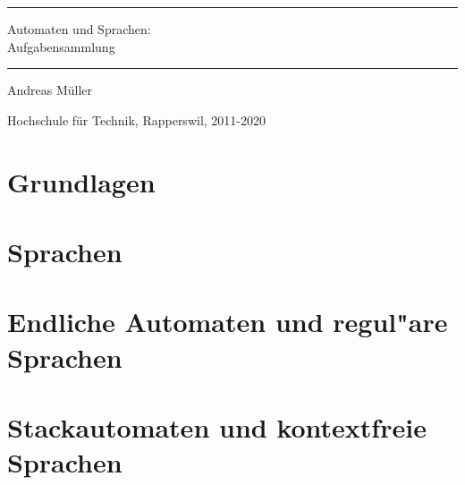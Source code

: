 \documentclass[a4paper,12pt]{book}
\begin{document}
\pagestyle{fancy}
\rhead{}
\frontmatter
\newcommand\HRule{\noindent\rule{\linewidth}{1.5pt}}
\begin{titlepage}
\HRule
\vspace*{2pt}
\begin{flushright}
{\Huge
Automaten und Sprachen:\\
\bigskip
Aufgabensammlung}
\end{flushright}
\HRule
\begin{flushright}
\vspace{30pt}
\LARGE
Andreas Müller
\end{flushright}
\begin{center}
Hochschule für Technik, Rapperswil, 2011-2020
\end{center}
\end{titlepage}
\hypersetup{
        colorlinks=true,
        linktoc=all,
        linkcolor=blue
}
\tableofcontents
\newenvironment{beispiel}[1][Beispiel]{%
\begin{proof}[#1]%
\renewcommand{\qedsymbol}{$\bigcirc$}
}{\end{proof}}
\mainmatter

\allowdisplaybreaks
\openthemaindex
{}



\chapter{Grundlagen}

\chapter{Sprachen}

\chapter{Endliche Automaten und regul"are Sprachen}

\chapter{Stackautomaten und kontextfreie Sprachen}

\end{document}
